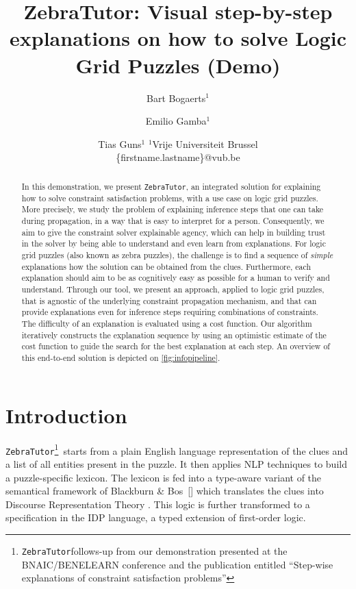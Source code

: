 \documentclass{article}
\title{ZebraTutor: Visual step-by-step explanations on how to solve Logic Grid Puzzles (Demo)}
\author{
Bart Bogaerts$^1$
\and
Emilio Gamba$^1$\and
Tias Guns$^1$
\affiliations
$^1$Vrije Universiteit Brussel\\
\emails
\{firstname.lastname\}@vub.be
}
\newcommand{\ourtool}{\texttt{ZebraTutor}}
\begin{document}

\maketitle

\begin{abstract}
In this demonstration, we present \ourtool, an integrated solution for explaining how to solve constraint satisfaction problems, with a use case on logic grid puzzles. More precisely, we study the problem of explaining inference steps that one can take during propagation, in a way that is easy to interpret for a person. Consequently, we aim to give the constraint solver explainable agency, which can help in building trust in the solver by being able to understand and even learn from explanations.
For logic grid puzzles (also known as zebra puzzles), the challenge is to find a sequence of \textit{simple} explanations how the solution can be obtained from the clues. Furthermore, each explanation should aim to be as cognitively easy as possible for a human to verify and understand.
Through our tool, we present an approach, applied to logic grid puzzles, that is agnostic of the underlying constraint propagation mechanism, and that can provide explanations even for inference steps requiring combinations of constraints. The difficulty of an explanation is evaluated using a cost function. Our algorithm iteratively constructs the explanation sequence by using an optimistic estimate of the cost function to guide the search for the best explanation at each step.
An overview of this end-to-end solution is depicted on \ref{fig:infopipeline}.

\end{abstract}

\section{Introduction}


\ourtool\footnote{\ourtool follows-up from our demonstration presented at the BNAIC/BENELEARN conference and the publication entitled ``Step-wise explanations of constraint satisfaction problems''}~starts from a plain English language representation of the clues and a list of all entities present in the puzzle. It then applies NLP techniques to build a puzzle-specific lexicon. The lexicon is fed into a type-aware variant of the semantical framework of Blackburn \& Bos~[\citeyear{Blackburn2005,Blackburn2006}] which translates the clues into Discourse Representation Theory \cite{DRT}. This logic is further transformed to a specification in the IDP language, a typed extension of first-order logic.
\end{document}
